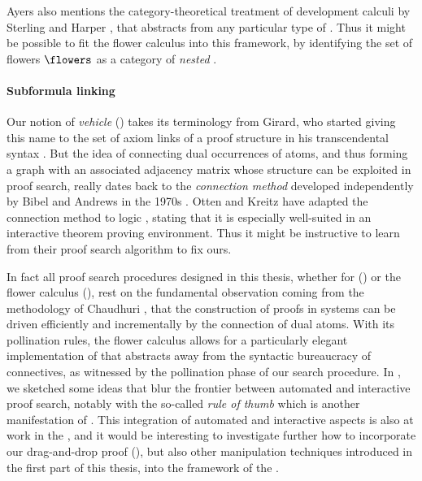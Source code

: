 \begin{scope}
Ayers also mentions the category-theoretical treatment of development calculi by
Sterling and Harper , that abstracts from any
particular type of . Thus it might be possible to fit the flower
calculus into this framework, by identifying the set of flowers $\flowers$ as a
category of \emph{nested }.

\paragraph{Subformula linking}

Our notion of \emph{vehicle} () takes its terminology from
Girard, who started giving this name to the set of axiom links of a proof
structure in his transcendental syntax . But the idea of connecting dual
occurrences of atoms, and thus forming a graph with an associated adjacency
matrix whose structure can be exploited in proof search, really dates back to
the \emph{connection method} developed independently by Bibel and Andrews in the
1970s . Otten and Kreitz have adapted the connection method
to  logic , stating that it is
especially well-suited in an interactive theorem proving environment. Thus it
might be instructive to learn from their proof search algorithm to fix ours.

In fact all proof search procedures designed in this thesis, whether for  () or the flower calculus
(), rest on the fundamental observation coming from the
 methodology of Chaudhuri , that the
construction of proofs in  systems can be driven efficiently and
incrementally by the connection of dual atoms. With its pollination rules, the
flower calculus allows for a particularly elegant implementation of  that abstracts away from the syntactic bureaucracy of 
connectives, as witnessed by the pollination phase of our search procedure. In
, we sketched some ideas that blur the frontier
between automated and interactive proof search, notably with the so-called
\emph{rule of thumb} which is another manifestation of . This
integration of automated and interactive aspects is also at work in the , and it would be interesting to investigate further how to incorporate
our drag-and-drop proof  (), but also other 
manipulation techniques introduced in the first part of this thesis, into the
 framework of the .


\end{scope}
